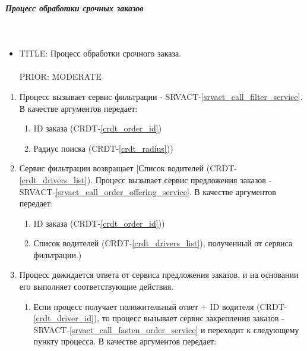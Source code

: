 \subparagraph{Процесс обработки срочных заказов} \mbox{} \\ \label{}

  \begin{itemize}

       \item {
         TITLE: Процесс обработки срочного заказа.\\
         \\
         PRIOR: MODERATE\\
       }

       \end{itemize}

  \begin{alg} \label{alg_urgent_order_processing} \mbox{}

      \begin{enumerate}

         	\item Процесс вызывает сервис фильтрации - SRVACT-\ref{srvact_call_filter_service}. В качестве аргументов передает:

         		\begin{enumerate}
         			\item ID заказа (CRDT-\ref{crdt_order_id})
         			\item Радиус поиска (CRDT-\ref{crdt_radius}))
         		\end{enumerate}

          \item Сервис фильтрации возвращает [Список водителей (CRDT-\ref{crdt_drivers_list}). Процесс вызывает сервис предложения заказов - SRVACT-\ref{srvact_call_order_offering_service}. В качестве аргументов передает:

         		\begin{enumerate}
         			\item ID заказа (CRDT-\ref{crdt_order_id}))
         			\item Список водителей (CRDT-\ref{crdt_drivers_list}), полученный от сервиса фильтрации.)
         		\end{enumerate}
        
          \item Процесс дожидается ответа от сервиса предложения заказов, и на основании его выполняет соответствующие действия.
          
          	\begin{enumerate}
         			\item Если процесс получает положительный ответ + ID водителя (CRDT-\ref{crdt_driver_id}), то процесс вызывает сервис закрепления заказов - SRVACT-\ref{srvact_call_fasten_order_service} и переходит к следующему пункту процесса. В качестве аргументов передает: 


\end{enumerate}
\end{enumerate}
\end{alg}
